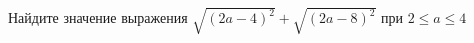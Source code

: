 \begin{ex}
	\begin{condition}
		Найдите значение выражения \( \sqrt{(2a-4)^2}+\sqrt{(2a-8)^2} \) при \( 2\le a \le4 \)
	\end{condition}
\end{ex}
